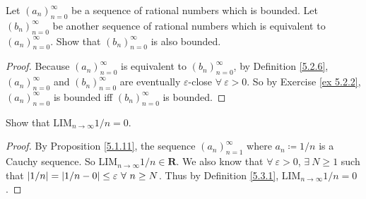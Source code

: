 \begin{exercise}\label{ex 5.3.4}
    Let \((a_n)_{n = 0}^{\infty}\) be a sequence of rational numbers which is bounded.
    Let \((b_n)_{n = 0}^{\infty}\) be another sequence of rational numbers which is equivalent to \((a_n)_{n = 0}^{\infty}\).
    Show that \((b_n)_{n = 0}^{\infty}\) is also bounded.
\end{exercise}

\begin{proof}
    Because \((a_n)_{n = 0}^{\infty}\) is equivalent to \((b_n)_{n = 0}^{\infty}\), by Definition \ref{5.2.6}, \((a_n)_{n = 0}^{\infty}\) and \((b_n)_{n = 0}^{\infty}\) are eventually \(\varepsilon\)-close \(\forall\ \varepsilon > 0\).
    So by Exercise \ref{ex 5.2.2}, \((a_n)_{n = 0}^{\infty}\) is bounded iff \((b_n)_{n = 0}^{\infty}\) is bounded.
\end{proof}

\begin{exercise}\label{ex 5.3.5}
    Show that \(\text{LIM}_{n \to \infty} 1 / n = 0\).
\end{exercise}

\begin{proof}
    By Proposition \ref{5.1.11}, the sequence \((a_n)_{n = 1}^{\infty}\) where \(a_n \coloneqq 1 / n\) is a Cauchy sequence.
    So \(\text{LIM}_{n \to \infty} 1 / n \in \mathbf{R}\).
    We also know that \(\forall\ \varepsilon > 0\), \(\exists\ N \geq 1\) such that \(\abs*{1 / n} = \abs*{1 / n - 0} \leq \varepsilon \ \forall\ n \geq N\).
    Thus by Definition \ref{5.3.1}, \(\text{LIM}_{n \to \infty} 1 / n = 0\).
\end{proof}